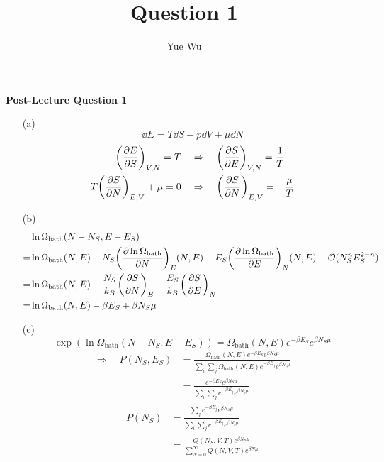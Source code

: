 \documentclass{article}
\title{Question 1}
\author{Yue Wu}
\begin{document}
    \begin{center}
        \LARGE\textbf{Post-Lecture Question 1}
    \end{center}

    \begin{enumerate}
        \item[(a)]
        $$\dd{E}=T\dd{S}-p\dd{V}+\mu\dd{N}$$
        \begin{align*}
            \qty(\pdv{E}{S})_{V,N}=T\quad&\Rightarrow\quad\qty(\pdv{S}{E})_{V,N}=\frac{1}{T}\\
            T\qty(\pdv{S}{N})_{E,V}+\mu=0\quad&\Rightarrow\quad\qty(\pdv{S}{N})_{E,V}=-\frac{\mu}{T}
        \end{align*}
        \item[(b)]
        \begin{align*}
            &\ln\Omega_{\text{bath}}(N-N_S,E-E_S)\\
            =&\ln\Omega_{\text{bath}}(N,E)-N_S\qty(\pdv{\ln\Omega_{\text{bath}}}{N})_E (N,E)-E_S\qty(\pdv{\ln\Omega_{\text{bath}}}{E})_N (N,E)+\mathcal{O}(N_S^{n}E_S^{2-n})\\
            =&\ln\Omega_{\text{bath}}(N,E)-\frac{N_S}{k_B}\qty(\pdv{S}{N})_E-\frac{E_S}{k_B}\qty(\pdv{S}{E})_N\\
            =&\ln\Omega_{\text{bath}}(N,E)-\beta E_S+\beta N_S\mu
        \end{align*}
        \item[(c)]
        $$\exp(\ln\Omega_{\text{bath}}(N-N_S,E-E_S))=\Omega_{\text{bath}}(N,E)e^{-\beta E_S}e^{\beta N_S\mu}$$
        \begin{align*}
            \Rightarrow\quad P(N_S,E_S)&=\frac{\Omega_{\text{bath}}(N,E)e^{-\beta E_S}e^{\beta N_S\mu}}{\sum_i\sum_j\Omega_{\text{bath}}(N,E)e^{-\beta E_j}e^{\beta N_i\mu}}\\
            &=\frac{e^{-\beta E_S}e^{\beta N_S\mu}}{\sum_i\sum_j e^{-\beta E_j}e^{\beta N_i\mu}}
        \end{align*}
        \begin{align*}
            P(N_S)&=\frac{\sum_j e^{-\beta E_j}e^{\beta N_S\mu}}{\sum_i\sum_j e^{-\beta E_j}e^{\beta N_i\mu}}\\
            &=\frac{Q(N_S,V,T)e^{\beta N_S\mu}}{\sum_{N=0}^{\infty}Q(N,V,T)e^{\beta N\mu}}
        \end{align*}
    \end{enumerate}
\end{document}
